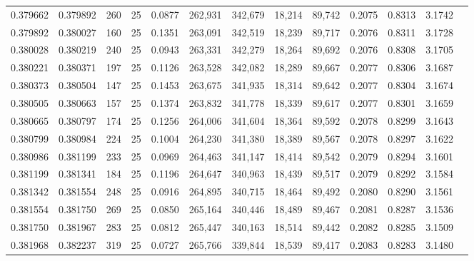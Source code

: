 \begin{tabular}{rrrrrrrrrrrrr}
0.379662 & 0.379892 &   260 &  25 &                                     0.0877 & 262,931 & 342,679 &  18,214 &  89,742 & 0.2075 & 0.8313 & 3.1742 \\
0.379892 & 0.380027 &   160 &  25 &                                     0.1351 & 263,091 & 342,519 &  18,239 &  89,717 & 0.2076 & 0.8311 & 3.1728 \\
0.380028 & 0.380219 &   240 &  25 &                                     0.0943 & 263,331 & 342,279 &  18,264 &  89,692 & 0.2076 & 0.8308 & 3.1705 \\
0.380221 & 0.380371 &   197 &  25 &                                     0.1126 & 263,528 & 342,082 &  18,289 &  89,667 & 0.2077 & 0.8306 & 3.1687 \\
0.380373 & 0.380504 &   147 &  25 &                                     0.1453 & 263,675 & 341,935 &  18,314 &  89,642 & 0.2077 & 0.8304 & 3.1674 \\
0.380505 & 0.380663 &   157 &  25 &                                     0.1374 & 263,832 & 341,778 &  18,339 &  89,617 & 0.2077 & 0.8301 & 3.1659 \\
0.380665 & 0.380797 &   174 &  25 &                                     0.1256 & 264,006 & 341,604 &  18,364 &  89,592 & 0.2078 & 0.8299 & 3.1643 \\
0.380799 & 0.380984 &   224 &  25 &                                     0.1004 & 264,230 & 341,380 &  18,389 &  89,567 & 0.2078 & 0.8297 & 3.1622 \\
0.380986 & 0.381199 &   233 &  25 &                                     0.0969 & 264,463 & 341,147 &  18,414 &  89,542 & 0.2079 & 0.8294 & 3.1601 \\
0.381199 & 0.381341 &   184 &  25 &                                     0.1196 & 264,647 & 340,963 &  18,439 &  89,517 & 0.2079 & 0.8292 & 3.1584 \\
0.381342 & 0.381554 &   248 &  25 &                                     0.0916 & 264,895 & 340,715 &  18,464 &  89,492 & 0.2080 & 0.8290 & 3.1561 \\
0.381554 & 0.381750 &   269 &  25 &                                     0.0850 & 265,164 & 340,446 &  18,489 &  89,467 & 0.2081 & 0.8287 & 3.1536 \\
0.381750 & 0.381967 &   283 &  25 &                                     0.0812 & 265,447 & 340,163 &  18,514 &  89,442 & 0.2082 & 0.8285 & 3.1509 \\
0.381968 & 0.382237 &   319 &  25 &                                     0.0727 & 265,766 & 339,844 &  18,539 &  89,417 & 0.2083 & 0.8283 & 3.1480 \\

\end{tabular}
